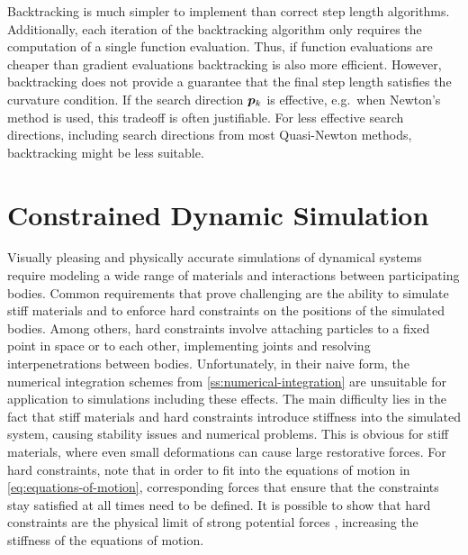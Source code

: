 Backtracking is much simpler to implement than correct step length algorithms. Additionally, each iteration of the backtracking algorithm
only requires the computation of a single function evaluation. Thus, if function evaluations are cheaper than gradient evaluations 
backtracking is also more efficient. However, backtracking does not provide a guarantee that the final step length satisfies the curvature
condition. If the search direction $\bm{p}_k$ is effective, e.g.\ when Newton's method is used, this tradeoff is often justifiable. 
For less effective search directions, including search directions from most Quasi-Newton methods, backtracking might be less suitable.

\section{Constrained Dynamic Simulation}\label{s:dynamic-simulation}
Visually pleasing and physically accurate simulations of dynamical systems require modeling a wide range of materials and 
interactions between participating bodies. Common requirements that prove challenging are the ability to simulate stiff materials
and to enforce hard constraints on the positions of the simulated bodies. Among others, hard constraints involve attaching particles
to a fixed point in space or to each other, implementing joints and resolving interpenetrations between bodies. Unfortunately, in their 
naive form, the numerical integration schemes from \cref{ss:numerical-integration} are unsuitable for application to simulations 
including these effects. The main difficulty lies in the fact that stiff materials and hard constraints introduce stiffness into 
the simulated system, causing stability issues and numerical problems. This is obvious for stiff materials, where even small 
deformations can cause large restorative forces. For hard constraints, note that in order to fit into the equations of motion in 
\autoref{eq:equations-of-motion}, corresponding forces that ensure that the constraints stay satisfied at all times need to be defined. 
It is possible to show that hard constraints are the physical limit of strong potential forces \cite{servin2006}, increasing the 
stiffness of the equations of motion. 

